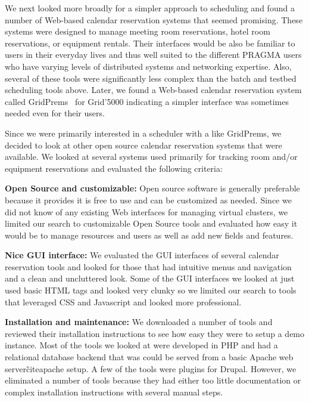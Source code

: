 \documentclass{acm_proc_article-sp}
\begin{document}
We next looked more broadly for a simpler approach to scheduling and found a number of Web-based calendar reservation systems that seemed promising.  These systems were designed to manage meeting room reservations, hotel room reservations, or equipment rentals.   Their interfaces would be also be familiar to users in their everyday lives and thus well suited to the different PRAGMA users who have varying levels of distributed systems and networking expertise.  Also, several of these tools were significantly less complex than the batch and testbed scheduling tools above.  Later, we found a Web-based calendar reservation system called GridPrems~\cite{gridprems} for Grid'5000 indicating a simpler interface was sometimes needed even for their users.


Since we were primarily interested in a scheduler with a like GridPrems, we decided to look at other open source calendar reservation systems that were available.  We looked at several systems used primarily for tracking room and/or equipment reservations and evaluated the following criteria:

\textbf{Open Source and customizable:}  Open source software is generally preferable because it provides it is free to use and can be customized as needed.  Since we did not know of any existing Web interfaces for managing virtual clusters, we limited our search to customizable Open Source tools and evaluated how easy it would be to manage resources and users as well as add new fields and features. 

\textbf{Nice GUI interface:}  We evaluated the GUI interfaces of several calendar reservation tools and looked for those that had intuitive menus and navigation and  a clean and uncluttered look.  Some of the GUI interfaces we looked at just used basic HTML tags and looked very clunky so we limited our search to tools that leveraged CSS and Javascript and looked more professional.   

\textbf{Installation and maintenance:}  We downloaded a number of tools and reviewed their installation instructions to see how easy they were to setup a demo instance.  Most of the tools we looked at were developed in PHP and had a relational database backend that was could be served from a basic  Apache web server\~cite{apache} setup.   A few of the tools were plugins for Drupal.  However, we eliminated a number of tools because they had either too little documentation or complex installation instructions with several manual steps.   
\end{document}
